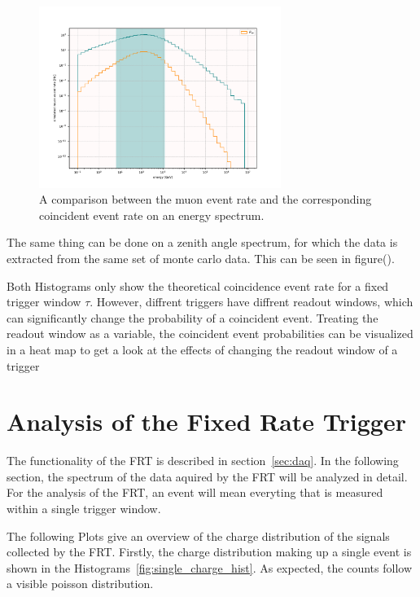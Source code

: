 \begin{figure}
    \centering
    \includegraphics[width=0.7\textwidth]{Plots/concidence_rate_energy.pdf}
    \caption{A comparison between the muon event rate and the corresponding coincident event rate on an energy spectrum.}
    \label{fig:coin_rate_comp}
\end{figure}

The same thing can be done on a zenith angle spectrum, for which the data is extracted from the same set of monte carlo data. This can be seen in figure().

    

Both Histograms only show the theoretical coincidence event rate for a fixed trigger window $\tau$. However, diffrent triggers have diffrent readout windows, which 
can significantly change the probability of a coincident event. Treating the readout window as a variable, the coincident event probabilities can be visualized in 
a heat map to get a look at the effects of changing the readout window of a trigger %

\section{Analysis of the Fixed Rate Trigger}

The functionality of the FRT is described in section~\ref{sec:daq}. In the following section, the spectrum of the data aquired by the FRT will be analyzed in 
detail. For the analysis of the FRT, an event will mean everyting that is measured within a single trigger window. 

The following Plots give an overview of the charge distribution of the signals collected by the FRT. Firstly, the charge distribution making up a 
single event is shown in the Histograms~\ref{fig:single_charge_hist}. As expected, the counts follow a visible poisson distribution.

